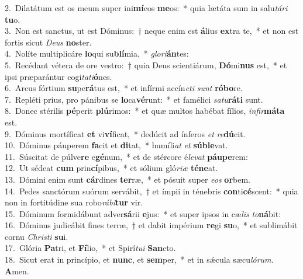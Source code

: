 {2.~}Dilatátum est os meum super ini\textbf{mí}cos \textbf{me}os:~* quia lætáta sum in salu\textit{tá}\textit{ri} \textbf{tu}o.\\
{3.~}Non est sanctus, ut est Dóminus:~† neque enim est \textbf{á}lius \textbf{ex}tra te,~* et non est fortis sicut \textit{De}\textit{us} \textbf{no}ster.\\
{4.~}Nolíte multiplicáre \textbf{lo}qui su\textbf{blí}mia,~* \textit{glo}\textit{ri}\textbf{án}tes:\\
{5.~}Recédant vétera de ore vestro:~† quia Deus scientiárum, \textbf{Dó}mi\textbf{nus} est,~* et ipsi præparántur cogi\textit{ta}\textit{ti}\textbf{ó}nes.\\
{6.~}Arcus fórtium \textbf{su}pe\textbf{rá}tus est,~* et infírmi accín\textit{cti} \textit{sunt} \textbf{ró}\textbf{bo}re.\\
{7.~}Repléti prius, pro pánibus se \textbf{lo}ca\textbf{vé}runt:~* et famélici \textit{sa}\textit{tu}\textbf{rá}\textbf{ti} sunt.\\
{8.~}Donec stérilis \textbf{pé}perit \textbf{plú}rimos:~* et quæ multos habébat fílios, \textit{in}\textit{fir}\textbf{má}\textbf{ta} est.\\
{9.~}Dóminus mortíficat \textbf{et} vi\textbf{ví}ficat,~* dedúcit ad ínferos \textit{et} \textit{re}\textbf{dú}cit.\\
{10.~}Dóminus páuperem \textbf{fa}cit et \textbf{di}tat,~* humíli\textit{at} \textit{et} \textbf{sú}\textbf{ble}vat.\\
{11.~}Súscitat de púlve\textbf{re} e\textbf{gé}num,~* et de stércore é\textit{le}\textit{vat} \textbf{páu}\textbf{pe}rem:\\
{12.~}Ut sédeat \textbf{cum} prin\textbf{cí}pibus,~* et sólium gló\textit{ri}\textit{æ} \textbf{té}\textbf{ne}at.\\
{13.~}Dómini enim sunt \textbf{cár}dines \textbf{ter}ræ,~* et pósuit super \textit{e}\textit{os} \textbf{or}bem.\\
{14.~}Pedes sanctórum suórum servábit,~† et ímpii in ténebris \textbf{con}ti\textbf{cé}scent:~* quia non in fortitúdine sua robo\textit{rá}\textit{bi}\textbf{tur} vir.\\
{15.~}Dóminum formidábunt adver\textbf{sá}rii \textbf{e}jus:~* et super ipsos in cæ\textit{lis} \textit{to}\textbf{ná}bit:\\
{16.~}Dóminus judicábit fines terræ,~† et dabit impérium \textbf{re}gi \textbf{su}o,~* et sublimábit cornu \textit{Chri}\textit{sti} \textbf{su}i.\\
{17.~}Glória \textbf{Pa}tri, et \textbf{Fí}lio,~* et Spirí\textit{tu}\textit{i} \textbf{San}cto.\\
{18.~}Sicut erat in princípio, et \textbf{nunc}, et \textbf{sem}per,~* et in sǽcula sæcu\textit{ló}\textit{rum}. \textbf{A}men.\\
